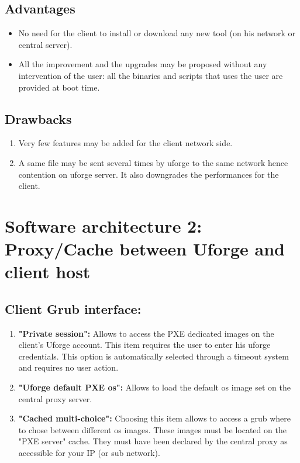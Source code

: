 \documentclass[12pt]{article}											%
\begin{document}
\subsection{Advantages}
	\begin{itemize}
		\item No need for the client to install or download any new tool (on his network or central server).
		\item All the improvement and the upgrades may be proposed without any intervention of the user: all the binaries and scripts that uses the user are provided at boot time.
	\end{itemize}
   


\subsection{Drawbacks}
	\begin{enumerate}
		\item Very few features may be added for the client network side.
		\item A same file may be sent several times by uforge to the same network hence contention on uforge server.  It also downgrades the performances for the client.
	\end{enumerate}








\section{Software architecture 2: Proxy/Cache between Uforge and client host}
\subsection{Client Grub interface:}
	\begin{enumerate}
		\item \textbf{"Private session":} Allows to access the PXE dedicated images on the client's Uforge account.   This item requires the user to enter his uforge credentials.   This option is automatically selected through a timeout system and requires no user action.
		\item \textbf{"Uforge default PXE os":} Allows to load the default os image set on the central proxy server.\\
		\item \textbf{"Cached multi-choice":} Choosing this item allows to access a grub where to chose between different os images.   These images must be located on the "PXE server" cache.   They must have been declared by the central proxy as accessible for your IP (or sub network).
	\end{enumerate}
\end{document}
